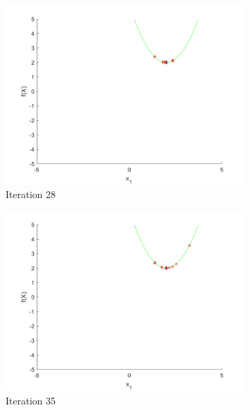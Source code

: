 \begin{figure}
\begin{subfigure}[b]{0.4\textwidth}
   \includegraphics[width=\textwidth]{img/smpl/circshft/loa-iter-28}
   \caption{Iteration 28}
   \label{fig:s3-iter-4}
 \end{subfigure}
 \begin{subfigure}[b]{0.4\textwidth}
   \includegraphics[width=\textwidth]{img/smpl/circshft/loa-iter-35}
   \caption{Iteration 35}
   \label{fig:s3-iter-5}
 \end{subfigure}
 \begin{subfigure}[b]{0.4\textwidth}

\end{subfigure}
\end{figure}
